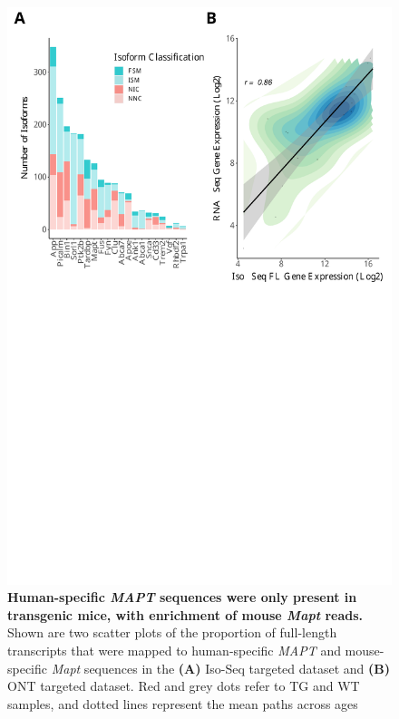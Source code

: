 \begin{figure}[!htp]
	\begin{center}
		\includegraphics[page=12,trim={0 20cm 0 0cm},clip,scale = 0.60]{Figures/ONTvsIsoSeq.pdf}
	\end{center}
	\captionsetup{width=0.95\textwidth}
	\caption[Quantifying human-specific \textit{MAPT} sequences in Iso-Seq targeted dataset]%
	{\textbf{Human-specific \textit{MAPT} sequences were only present in transgenic mice, with enrichment of mouse \textit{Mapt} reads.} Shown are two scatter plots of the proportion of full-length transcripts that were mapped to human-specific \textit{MAPT} and mouse-specific \textit{Mapt} sequences in the \textbf{(A)} Iso-Seq targeted dataset and \textbf{(B)} ONT targeted dataset. Red and grey dots refer to TG and WT samples, and dotted lines represent the mean paths across ages}
	\label{fig:hmapt_ont_isoseq}
\end{figure}

